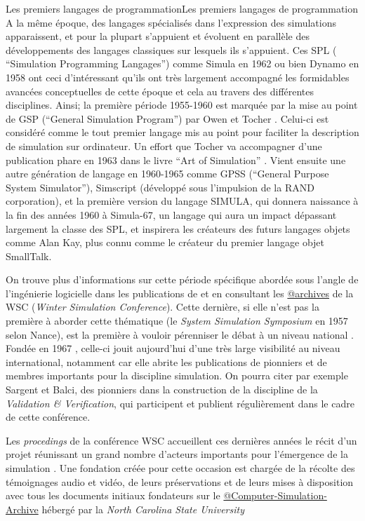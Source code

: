 \begin{testiv}{Les premiers langages de programmation}{Les premiers langages de programmation}
A la même époque, des langages spécialisés dans l'expression des simulations apparaissent, et pour la plupart s'appuient et évoluent en parallèle des développements des langages classiques sur lesquels ils s'appuient. Ces SPL ( \foreignquote{english}{Simulation Programming Langages}) comme Simula en 1962 ou bien Dynamo en 1958 ont ceci d'intéressant qu'ils ont très largement accompagné les formidables avancées conceptuelles de cette époque et cela au travers des différentes disciplines. Ainsi; la première période 1955-1960 est marquée par la mise au point de GSP (\foreignquote{english}{General Simulation Program}) par Owen et Tocher \autocite{Tocher1960}. Celui-ci est considéré comme le tout premier langage mis au point pour faciliter la description de simulation sur ordinateur. Un effort que Tocher va accompagner d'une publication phare en 1963 dans le livre \foreignquote{english}{Art of Simulation} \autocite{Tocher1963} . Vient ensuite une autre génération de langage en 1960-1965 comme GPSS (\foreignquote{english}{General Purpose System Simulator}), Simscript (développé sous l'impulsion de la RAND corporation), et la première version du langage SIMULA, qui donnera naissance à la fin des années 1960 à Simula-67, un langage qui aura un impact dépassant largement la classe des SPL, et inspirera les créateurs des futurs langages objets comme Alan Kay, plus connu comme le créateur du premier langage objet SmallTalk.

On trouve plus d'informations sur cette période spécifique abordée sous l'angle de l'ingénierie logicielle dans les publications de \textcites{Nance2013,Nance1993, Araten1992, Nance2002} et en consultant les \href{http://informs-sim.org/}{@archives} de la WSC (\textit{Winter Simulation Conference}). Cette dernière, si elle n'est pas la première à aborder cette thématique (le \textit{System Simulation Symposium} en 1957 selon Nance), est la première à vouloir pérenniser le débat à un niveau national \autocite{Nance2002}. Fondée en 1967 \autocite{Crain1992, Araten1992}, celle-ci jouit aujourd'hui d'une très large visibilité au niveau international, notamment car elle abrite les publications de pionniers et de membres importants pour la discipline simulation. On pourra citer par exemple Sargent et Balci, des pionniers dans la construction de la discipline de la \textit{Validation \& Verification}, qui participent et publient régulièrement dans le cadre de cette conférence.

Les \textit{procedings} de la conférence WSC accueillent ces dernières années le récit d'un projet réunissant un grand nombre d'acteurs importants pour l'émergence de la simulation \autocite{Nance2013}. Une fondation créée pour cette occasion est chargée de la récolte des témoignages audio et vidéo, de leurs préservations et de leurs mises à disposition avec tous les documents initiaux fondateurs sur le \href{http://d.lib.ncsu.edu/computer-simulation/}{@Computer-Simulation-Archive} hébergé par la \textit{North Carolina State University}

\end{testiv}

